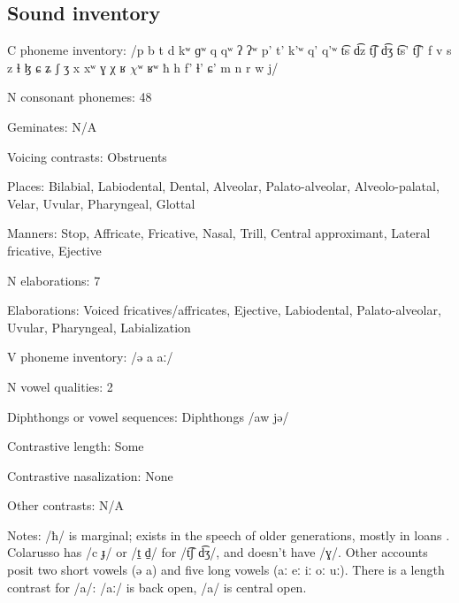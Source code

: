 {\subsection*{Sound inventory}
\begin{appendixdesc}

\item[C phoneme inventory:] /p b t d kʷ ɡʷ q qʷ ʔ ʔʷ p’ t’ k’ʷ q’ q’ʷ t͡s d͡z t͡ʃ d͡ʒ t͡s’ t͡ʃ’ f v s z ɬ ɮ ɕ ʑ ʃ ʒ x xʷ ɣ χ ʁ $\chi ʷ$ ʁʷ ħ h f' ɬ’ ɕ' m n r w j/

\item[N consonant phonemes:] 48

\item[Geminates:] N/A

\item[Voicing contrasts:] Obstruents

\item[Places:] Bilabial, Labiodental, Dental, Alveolar, Palato-alveolar, Alveolo-palatal, Velar, Uvular, Pharyngeal, Glottal

\item[Manners:] Stop, Affricate, Fricative, Nasal, Trill, Central approximant, Lateral fricative, Ejective

\item[N elaborations:] 7

\item[Elaborations:] Voiced fricatives/affricates, Ejective, Labiodental, Palato-alveolar, Uvular, Pharyngeal, Labialization

\item[V phoneme inventory:] /ə a aː/

\item[N vowel qualities:] 2

\item[Diphthongs or vowel sequences:] Diphthongs /aw jə/

\item[Contrastive length:] Some

\item[Contrastive nasalization:] None

\item[Other contrasts:] N/A

\item[Notes:] /ħ/ is marginal; exists in the speech of older generations, mostly in  loans \citep[10]{Matasovic2010}. Colarusso has /c ɟ/ or /t̠ d̠/ for /t͡ʃ d͡ʒ/, and doesn’t have /ɣ/. Other accounts posit two short vowels (ə a) and five long vowels (aː eː iː oː uː). There is a length contrast for /a/: /aː/ is back open, /a/ is central open.
\end{appendixdesc}
}
